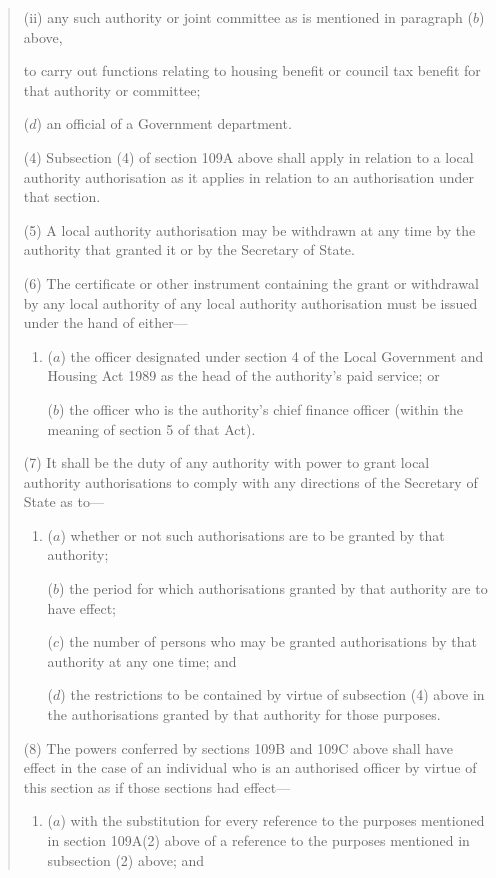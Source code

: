 \documentclass[12pt,a4paper]{article}
\begin{document}
\begin{quotation}
\begin{enumerate}
\begin{enumerate}
(ii) any such authority or joint committee as is mentioned in paragraph ($b$)  above,
\end{enumerate}
to carry out functions relating to housing benefit or council tax benefit for that authority or committee;

($d$) an official of a Government department.
\end{enumerate}

(4) Subsection (4)  of section 109A above shall apply in relation to a local authority authorisation as it applies in relation to an authorisation under that section.

(5) A local authority authorisation may be withdrawn at any time by the authority that granted it or by the Secretary of State.

(6) The certificate or other instrument containing the grant or withdrawal by any local authority of any local authority authorisation must be issued under the hand of either—
\begin{enumerate}\item[]
($a$) the officer designated under section 4 of the Local Government and Housing Act 1989 as the head of the authority’s paid service; or

($b$) the officer who is the authority’s chief finance officer (within the meaning of section 5 of that Act).
\end{enumerate}

(7) It shall be the duty of any authority with power to grant local authority authorisations to comply with any directions of the Secretary of State as to—
\begin{enumerate}\item[]
($a$) whether or not such authorisations are to be granted by that authority;

($b$) the period for which authorisations granted by that authority are to have effect;

($c$) the number of persons who may be granted authorisations by that authority at any one time; and

($d$) the restrictions to be contained by virtue of subsection (4)  above in the authorisations granted by that authority for those purposes.
\end{enumerate}

(8) The powers conferred by sections 109B and 109C above shall have effect in the case of an individual who is an authorised officer by virtue of this section as if those sections had effect—
\begin{enumerate}\item[]
($a$) with the substitution for every reference to the purposes mentioned in section 109A(2)  above of a reference to the purposes mentioned in subsection (2)  above; and


\end{enumerate}
\end{quotation}
\end{document}
